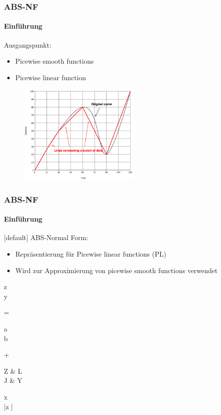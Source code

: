 \begin{frame}
	\frametitle{ABS-NF}
	\framesubtitle{Einführung}
	Ausgangspunkt:
	\begin{itemize}
		\item Picewise smooth functions
		\item Picewise linear function
	\end{itemize}
	\pause
	\begin{figure}[h]
		\includegraphics[width=6cm]{img/function}
	\end{figure}
\end{frame}
\begin{frame}
	\frametitle{ABS-NF}
	\framesubtitle{Einführung}
	[default]
	ABS-Normal Form:
	\begin{itemize}
		\item Repräsentierung für Picewise linear functions (PL)
		\item Wird zur Approximierung von picewise smooth functions verwendet
	\end{itemize}
	\begin{flalign*}
	\begin{pmatrix}
	\Delta z \\
	\Delta y
	\end{pmatrix}
	= 
	\begin{pmatrix}
	a \\
	b
	\end{pmatrix}
	+
	\begin{pmatrix}
	Z & L \\
	J & Y 
	\end{pmatrix}
	\times
	\begin{pmatrix}
	\Delta x \\
	|\Delta z |
	\end{pmatrix}
	\end{flalign*}
\end{frame}
